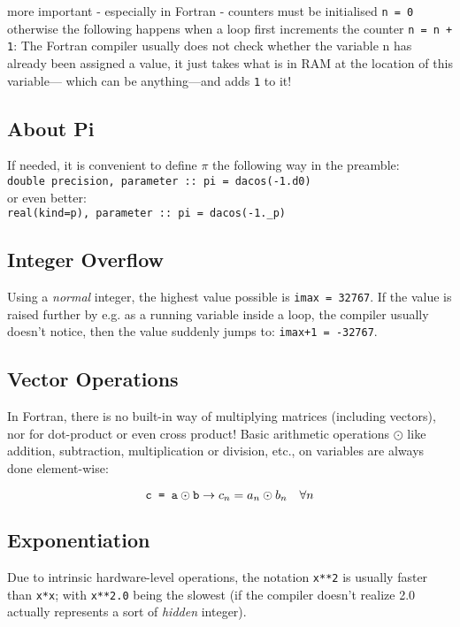 \documentclass{article}
\begin{document}
more important - especially in Fortran - counters must be initialised \verb|n = 0| otherwise the following happens when a loop first increments the counter \verb|n = n + 1|: The Fortran compiler usually does not check whether the variable n has already been assigned a value, it just takes what is in RAM at the location of this variable--- which can be anything---and adds \verb|1| to it!


\subsection{About Pi}

If needed, it is convenient to define $\pi$ the following way in the preamble:\\

\noindent
\verb|double precision, parameter :: pi = dacos(-1.d0)|\\

or even better:\\

\noindent
\verb|real(kind=p), parameter :: pi = dacos(-1._p)|\\


\subsection{Integer Overflow}

Using a \emph{normal} integer, the highest value possible is
\verb|imax = 32767|. If the value is raised further by e.g. as a running variable inside a loop, the compiler usually doesn't notice, then the value suddenly jumps to: \verb|imax+1 = -32767|.


\subsection{Vector Operations}

In Fortran, there is no built-in way of multiplying matrices (including vectors), nor for dot-product or even cross product! Basic arithmetic operations $\odot$ like addition, subtraction, multiplication or division, etc., on variables are always done element-wise:

\[\verb|c = a| \odot \verb|b| \to c_n = a_n \odot b_n \quad \forall n\]


\subsection{Exponentiation}

Due to intrinsic hardware-level operations, the notation \verb|x**2| is usually faster than \verb|x*x|; with \verb|x**2.0| being the slowest (if the compiler doesn't realize 2.0 actually represents a sort of \emph{hidden} integer).
\end{document}

